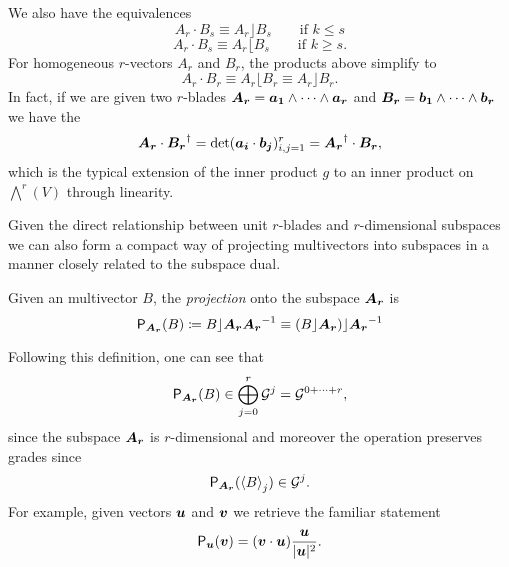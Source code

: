 We also have the equivalences
\begin{equation}
\label{eq:left_contraction_dot}
A_r \cdot B_s \equiv A_r \rfloor B_s \qquad \textrm{if $k\leq s$}
\end{equation}
\begin{equation}
\label{eq:right_contraction_dot}
A_r \cdot B_s \equiv A_r \lfloor B_s \qquad \textrm{if $k\geq s$}.
\end{equation}
For homogeneous $r$-vectors $A_r$ and $B_r$, the products above simplify to 
\begin{equation}
\label{dot_equivalent_contraction}
    A_r \cdot B_r \equiv A_r \lfloor B_r \equiv A_r \rfloor B_r.
\end{equation}
In fact, if we are given two $r$-blades $\blade{A_r} = \blade{a_1} \wedge \cdots \wedge \blade{a_r}$ and $\blade{B_r} = \blade{b_1} \wedge \cdots \wedge \blade{b_r}$ we have the 
\begin{equation}
\label{eq:dot_product}
\blade{A_r} \cdot \blade{B_r}^\dagger = \det(\blade{a_i} \cdot \blade{b_j} )_{i,j=1}^r = \blade{A_r}^\dagger \cdot \blade{B_r},
\end{equation}
which is the typical extension of the inner product $g$ to an inner product on $\bigwedge^r (V)$ through linearity.

Given the direct relationship between unit $r$-blades and $r$-dimensional subspaces we can also form a compact way of projecting multivectors into subspaces in a manner closely related to the subspace dual.  \begin{definition}
Given an multivector $B$, the \emph{projection} onto the subspace $\blade{A_r}$ is
\begin{equation}
\label{eq:projection}
\projection_{\blade{A_r}}(B) \coloneqq B\rfloor \blade{A_r} \blade{A_r}^{-1} \equiv (B\rfloor \blade{A_r})\rfloor \blade{A_r}^{-1}
\end{equation}
\end{definition}
Following this definition, one can see that
\begin{equation}
\projection_{\blade{A_r}}(B) \in \bigoplus_{j=0}^r \G^j = \G^{0+\cdots + r},
\end{equation}
since the subspace $\blade{A_r}$ is $r$-dimensional and moreover the operation preserves grades since
\begin{equation}
\projection_{\blade{A_r}}(\proj{j}{B}) \in \G^j.
\end{equation}
For example, given vectors $\blade{u}$ and $\blade{v}$ we retrieve the familiar statement 
\begin{equation}
\projection_{\blade{u}} (\blade{v}) = (\blade{v} \cdot \blade{u}) \frac{\blade{u}}{|\blade{u}|^2}.
\end{equation}

